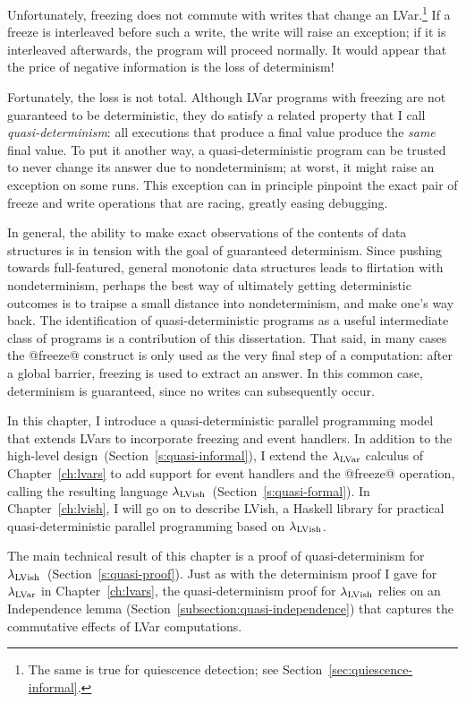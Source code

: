 Unfortunately, freezing does not commute with writes that change an
LVar.\footnote{The same is true for quiescence detection; see
  Section~\ref{sec:quiescence-informal}.}  If a freeze is interleaved
before such a write, the write will raise an exception; if it is
interleaved afterwards, the program will proceed normally.  It would
appear that the price of negative information is the loss of
determinism!

Fortunately, the loss is not total.  Although LVar programs with
freezing are not guaranteed to be deterministic, they do satisfy a
related property that I call \emph{quasi-determinism}: all executions
that produce a final value produce the \emph{same} final value.  To
put it another way, a quasi-deterministic program can be trusted to
never change its answer due to nondeterminism; at worst, it might
raise an exception on some runs.  This exception can in principle
pinpoint the exact pair of freeze and write operations that are
racing, greatly easing debugging.

In general, the ability to make exact observations of the contents of
data structures is in tension with the goal of guaranteed determinism.
Since pushing towards full-featured, general monotonic data structures
leads to flirtation with nondeterminism, perhaps the best way of
ultimately getting deterministic outcomes is to traipse a small
distance into nondeterminism, and make one's way back.  The
identification of quasi-deterministic programs as a useful
intermediate class of programs is a contribution of this dissertation.
That said, in many cases the @freeze@ construct is only used as the
very final step of a computation: after a global barrier, freezing is
used to extract an answer.  In this common case, determinism is
guaranteed, since no writes can subsequently occur.

In this chapter, I introduce a quasi-deterministic parallel
programming model that extends LVars to incorporate freezing and event
handlers.  In addition to the high-level
design~(Section~\ref{s:quasi-informal}), I extend the $\lambda_{\textrm{LVar}}$
calculus of Chapter~\ref{ch:lvars} to add support for event handlers
and the @freeze@ operation, calling the resulting language
$\lambda_{\textrm{LVish}}$~(Section~\ref{s:quasi-formal}).  In
Chapter~\ref{ch:lvish}, I will go on to describe LVish, a Haskell
library for practical quasi-deterministic parallel programming based
on $\lambda_{\textrm{LVish}}$.

The main technical result of this chapter is a proof of
quasi-determinism for
$\lambda_{\textrm{LVish}}$~(Section~\ref{s:quasi-proof}). Just as with the
determinism proof I gave for $\lambda_{\textrm{LVar}}$ in Chapter~\ref{ch:lvars},
the quasi-determinism proof for $\lambda_{\textrm{LVish}}$ relies on an
Independence lemma (Section~\ref{subsection:quasi-independence}) that
captures the commutative effects of LVar computations.

